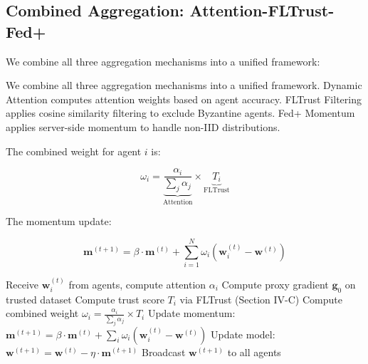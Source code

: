 \documentclass[conference]{IEEEtran}
\begin{document}
\subsection{Combined Aggregation: Attention-FLTrust-Fed+}

We combine all three aggregation mechanisms into a unified framework:

We combine all three aggregation mechanisms into a unified framework. Dynamic Attention computes attention weights based on agent accuracy. FLTrust Filtering applies cosine similarity filtering to exclude Byzantine agents. Fed+ Momentum applies server-side momentum to handle non-IID distributions.

The combined weight for agent $i$ is:

\begin{equation}
\omega_i = \underbrace{\frac{\alpha_i}{\sum_j \alpha_j}}_{\text{Attention}} \times \underbrace{T_i}_{\text{FLTrust}}
\end{equation}

The momentum update:

\begin{equation}
\mathbf{m}^{(t+1)} = \beta \cdot \mathbf{m}^{(t)} + \sum_{i=1}^{N} \omega_i (\mathbf{w}_i^{(t)} - \mathbf{w}^{(t)})
\end{equation}

\begin{algorithm}[htbp]
\caption{Combined Attention-FLTrust-Fed+ Aggregation}
\begin{algorithmic}[1]
\State Receive $\mathbf{w}_i^{(t)}$ from agents, compute attention $\alpha_i$
\State Compute proxy gradient $\mathbf{g}_0$ on trusted dataset
    \State Compute trust score $T_i$ via FLTrust (Section IV-C)
    \State Compute combined weight $\omega_i = \frac{\alpha_i}{\sum_j \alpha_j} \times T_i$
\EndFor
\State Update momentum:
\State $\mathbf{m}^{(t+1)} = \beta \cdot \mathbf{m}^{(t)} + \sum_i \omega_i (\mathbf{w}_i^{(t)} - \mathbf{w}^{(t)})$
\State Update model:
\State $\mathbf{w}^{(t+1)} = \mathbf{w}^{(t)} - \eta \cdot \mathbf{m}^{(t+1)}$
\State Broadcast $\mathbf{w}^{(t+1)}$ to all agents
\end{algorithmic}
\end{algorithm}

\end{document}
